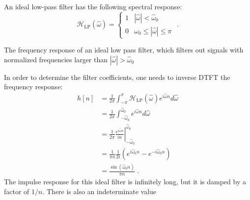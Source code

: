 An ideal low-pass filter has the following spectral response:
\begin{equation}
\mathcal{H}_{\mathrm{LP}}(\hat{\omega}) = \left\{ \begin{array}{cc}
1 & |\hat{\omega}| < \hat{\omega}_0\\
0 & \omega_0 \le |\hat{\omega}| \le \pi
\end{array}\right.\,\,.
\end{equation}
\begin{marginfigure}
\begin{center}
\end{center}
\caption{The frequency response of an ideal low pass filter, which filters out signals with normalized frequencies larger than $|\hat{\omega}|>\hat{\omega}_0$}
\end{marginfigure}
In order to determine the filter coefficients, one needs to inverse DTFT the frequency response:
\begin{align}
h[n] & =\frac{1}{2\pi}\int_{-\pi}^{\pi}\mathcal{H}_{\mathrm{LP}}(\hat{\omega}) e^{i\hat{\omega}n} d\hat{\omega} \\
&= \frac{1}{2\pi}\int_{-\hat{\omega}_0}^{\hat{\omega}_0} e^{i\hat{\omega}n}d\hat{\omega} \\
 &= \frac{1}{2\pi} \left.\frac{e^{i\hat{\omega}n}}{i n}\right\vert_{-\hat{\omega}_0}^{\hat{\omega}_0}\\
 &=\frac{1}{\pi n}\frac{1}{2i}(e^{i\hat{\omega}_0 n} - e^{-i\hat{\omega}_0n})\\
 &= \frac{\sin(\hat{\omega}_0 n)}{\pi n}\,\,.
\end{align}
The impulse response for this ideal filter is infinitely long, but it
is damped by a factor of $1/n$. There is also an indeterminate value
